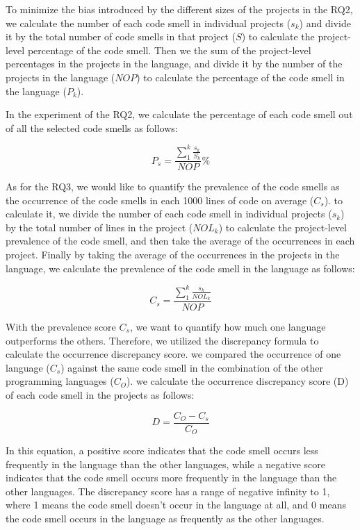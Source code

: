  To minimize the bias introduced by the different sizes of the projects in the RQ2, we calculate the number of each code smell in individual 
projects ($s_{k}$) and divide it by the total number of code smells in that project ({$S$}) to calculate the project-level percentage of the code smell. 
Then we the sum of the project-level percentages in the projects in the language, 
and divide it by the number of the projects in the language ($NOP$) to calculate the percentage of the code smell in the language ($P_{k}$).

In the experiment of the RQ2, we calculate the percentage of each code smell out of all the selected code smells as follows:

\begin{equation}
    P_{s} = \frac{\sum_{1}^{k}\frac{{s_{k}}}{S_{k}}}{NOP}\%
\end{equation}

As for the RQ3, we would like to quantify the prevalence of the code smells as the occurrence of the code smells in each 1000 lines of code on average ($C_{s}$).
to calculate it, we divide the number of each code smell in individual projects ($s_{k}$) by the total number of lines in the project ($NOL_{k}$) 
to calculate the project-level prevalence of the code smell,
and then take the average of the occurrences in each project. Finally by taking the average of the occurrences in the projects in the language, 
we calculate the prevalence of the code smell in the language as follows:

\begin{equation}
    C_{s} = \frac{\sum_{1}^{k}{\frac{s_{k}}{NOL_{k}}}}{NOP}
\end{equation}

With the prevalence score $C_{s}$, we want to quantify how much one language outperforms the others.
Therefore, we utilized the discrepancy formula to calculate the occurrence discrepancy score. we compared the occurrence of one language ($C_{s}$) against the same code smell in the combination of the other programming languages ($C_{O}$).
we calculate the occurrence discrepancy score (D) of each code smell in the projects as follows:

\begin{equation}
    D = \frac{C_{O} - C_{s}}{C_{O}}
\end{equation}

In this equation, a positive score indicates that the code smell occurs less frequently in the language than the other languages, while a negative score indicates that the code smell occurs more frequently in the language than the other languages.
The discrepancy score has a range of negative infinity to 1, where 1 means the code smell doesn't occur in the language at all, and 0 means the code smell occurs in the language as frequently as the other languages.

